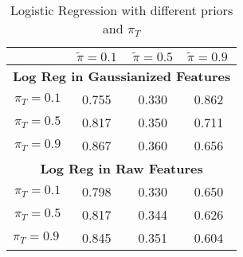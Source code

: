 \documentclass[12pt, twocolumn]{article}
\begin{document}
\begin{table}[H]
\caption{\label{tab:logistic-regression} Logistic Regression with different priors and $\pi_T$}
\begin{center}
\begin{tabular}{cccc}
\hline
\multicolumn{1}{l}{} & \textbf{$\tilde{\pi } = 0.1$} & \textbf{$\tilde{\pi } = 0.5$} & \multicolumn{1}{l}{\textbf{$\tilde{\pi}  = 0.9$}} \\ \hline
\multicolumn{4}{c}{\textbf{Log Reg in Gaussianized Features}} \\ \hline
\multicolumn{1}{c|}{ $\pi_T = 0.1$}     & 0.755     & 0.330     & 0.862    \\
\multicolumn{1}{c|}{ $\pi_T = 0.5$}     & 0.817     & 0.350     & 0.711    \\
\multicolumn{1}{c|}{ $\pi_T = 0.9$}     & 0.867     & 0.360     & 0.656    \\ \hline
\multicolumn{4}{c}{\textbf{Log Reg in Raw Features}}          \\ \hline
\multicolumn{1}{c|}{ $\pi_T = 0.1$}     & 0.798     & 0.330     & 0.650    \\
\multicolumn{1}{c|}{ $\pi_T = 0.5$}     & 0.817     & 0.344     & 0.626    \\
\multicolumn{1}{l|}{ $\pi_T = 0.9$}     & 0.845     & 0.351     & 0.604    \\ \hline
\end{tabular}
\end{center}
\end{table}
\end{document}
